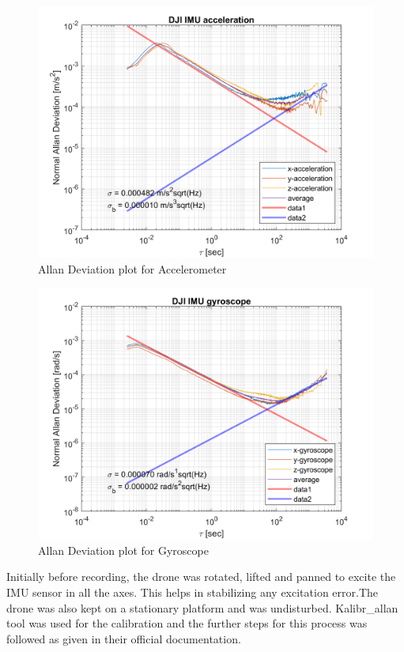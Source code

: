 \begin{figure}[h]
    \centering
    \includegraphics[scale=0.7]{Images/DJI_IMU_accel.png}
    \caption{Allan Deviation plot for Accelerometer}
    \label{fig:accel}
\end{figure}

\begin{figure}[h]
    \centering
    \includegraphics[scale=0.7]{Images/DJI_IMU_gyro.png}
    \caption{Allan Deviation plot for Gyroscope}
    \label{fig:gyro}
\end{figure}

Initially before recording, the drone was rotated, lifted and panned to excite the IMU sensor in all the axes. This helps in stabilizing any excitation error.The drone was also kept on a stationary platform and was undisturbed. Kalibr\_allan tool \cite{kalibrallan} was used for the calibration and the further steps for this process was followed as given in their official documentation.\\

